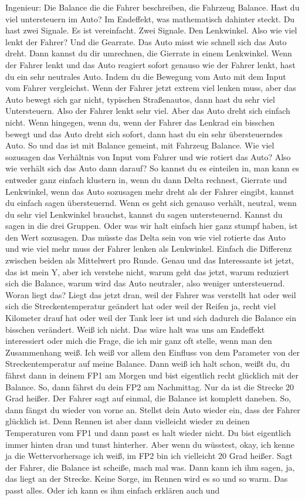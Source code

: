 Ingenieur:
Die Balance die die Fahrer beschreiben, die Fahrzeug Balance. Hast du viel untersteuern im Auto? Im Endeffekt, was mathematisch dahinter steckt. Du hast zwei Signale. Es ist vereinfacht. Zwei Signale. Den Lenkwinkel. Also wie viel lenkt der Fahrer? Und die Gearrate. Das Auto misst wie schnell sich das Auto dreht. Dann kannst du dir umrechnen, die Gierrate in einem Lenkwinkel. Wenn der Fahrer lenkt und das Auto reagiert sofort genauso wie der Fahrer lenkt, hast du ein sehr neutrales Auto. Indem du die Bewegung vom Auto mit dem Input vom Fahrer vergleichst. Wenn der Fahrer jetzt extrem viel lenken muss, aber das Auto bewegt sich gar nicht, typischen Straßenautos, dann hast du sehr viel Untersteuern. Also der Fahrer lenkt sehr viel. Aber das Auto dreht sich einfach nicht. Wenn hingegen, wenn du, wenn der Fahrer das Lenkrad ein bisschen bewegt und das Auto dreht sich sofort, dann hast du ein sehr übersteuerndes Auto. So und das ist mit Balance gemeint, mit Fahrzeug Balance. Wie viel sozusagen das Verhältnis von  Input vom Fahrer und wie rotiert das Auto? Also wie verhält sich das Auto dann darauf? So kannst du es einteilen in, man kann es entweder ganz einfach klustern in, wenn du dann Delta rechnest, Gierrate und Lenkwinkel, wenn das Auto sozusagen mehr dreht als der Fahrer eingibt, kannst du einfach sagen übersteuernd. Wenn es geht sich genauso verhält, neutral, wenn du sehr viel Lenkwinkel brauchst, kannst du sagen untersteuernd. Kannst du sagen in die drei Gruppen. Oder was wir halt einfach hier ganz stumpf haben, ist den Wert  sozusagen. Das müsste das Delta sein von wie viel rotierte das Auto und wie viel mehr muss der Fahrer lenken als Lenkwinkel. Einfach die Differenz zwischen beiden als Mittelwert pro Runde.  Genau und das Interessante ist jetzt, das ist mein Y, aber ich verstehe nicht, warum geht das jetzt, warum reduziert sich die Balance, warum wird das Auto neutraler, also weniger untersteuernd. Woran liegt das? Liegt das jetzt dran, weil der Fahrer was verstellt hat oder weil   sich die Streckentemperatur geändert hat oder weil der Reifen ja, recht viel Kilometer drauf hat oder weil der Tank leer ist und sich dadurch die Balance ein bisschen verändert. Weiß ich nicht. Das wäre halt was uns am Endeffekt interessiert oder mich die Frage, die ich mir ganz oft stelle, wenn man den Zusammenhang weiß. Ich weiß vor allem den Einfluss von dem Parameter von der Streckentemperatur auf meine Balance. Dann weiß ich halt schon, weißt du, du fährst dann in deinem FP1 am Morgen und bist eigentlich recht glücklich mit der Balance. So, dann fährst du dein FP2 am Nachmittag. Nur da ist die Strecke 20 Grad heißer. Der Fahrer sagt auf einmal, die Balance ist komplett daneben. So, dann fängst du wieder von vorne an. Stellst dein Auto wieder ein, dass der Fahrer glücklich ist. Denn Rennen ist aber dann vielleicht wieder zu deinen Temperaturen vom FP1 und dann passt es halt wieder nicht. Du bist eigentlich immer hinten dran und tunst hinterher. Aber wenn du wüsstest, okay, ich kenne ja die Wettervorhersage ich weiß, im FP2 bin ich vielleicht 20 Grad heißer. Sagt der Fahrer, die Balance ist scheiße, mach mal was. Dann kann ich ihm sagen, ja, das liegt an der Strecke. Keine Sorge, im Rennen wird es so und so warm. Das passt alles. Oder ich kann es ihm einfach erklären auch und 